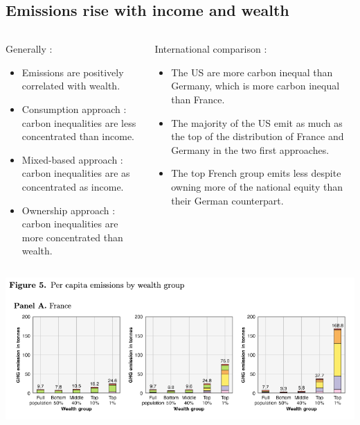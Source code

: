 \documentclass[10pt]{beamer}
\newcommand\ReduceFont{\fontsize{10}{7.2}\selectfont}
\begin{document}
\subsection{Emissions rise with income and wealth}
\begin{frame}{\subsecname}
    \begin{columns}
        \begin{column}{0.5\textwidth}
            Generally :
            \begin{itemize}
                \item Emissions are positively correlated with wealth.
                \item Consumption approach : carbon inequalities are less concentrated than income.
                \item Mixed-based approach : carbon inequalities are as concentrated as income.
                \item Ownership approach : carbon inequalities are more concentrated than wealth.
            \end{itemize}
        \end{column}
        \begin{column}{0.5\textwidth}
            \ReduceFont
            International comparison :
            \begin{itemize}
                \item The US are more carbon inequal than Germany, which is more carbon inequal than France.
                \item The majority of the US emit as much as the top of the distribution of France and Germany in the two first approaches.
                \item The top French group emits less despite owning more of the national equity than their German counterpart.
            \end{itemize}
        \end{column}
    \end{columns}
\end{frame}

\begin{frame}{\subsecname}
    \includegraphics[width=\textwidth]{../Figures/F51.png}
\end{frame}
\end{document}
